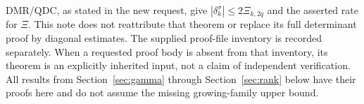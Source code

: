 DMR/QDC, as stated in the new request, give $|\delta_k^\sigma|\le2\Xi_{k,2q}$ and the asserted rate for $\Xi$. This note does not reattribute that theorem or replace its full determinant proof by diagonal estimates. The supplied proof-file inventory is recorded separately. When a requested proof body is absent from that inventory, its theorem is an explicitly inherited input, not a claim of independent verification. All results from Section~\ref{sec:gamma} through Section~\ref{sec:rank} below have their proofs here and do not assume the missing growing-family upper bound.
